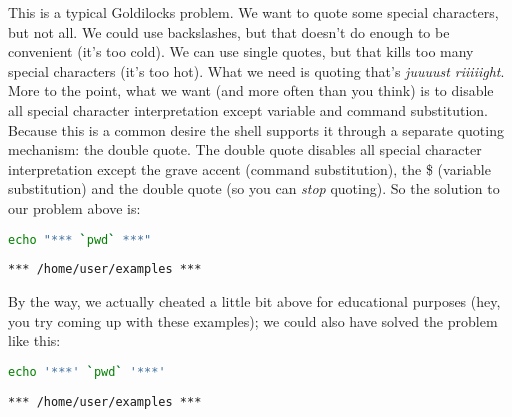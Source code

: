 This is a typical Goldilocks problem. We want to quote some special characters,
but not all. We could use backslashes, but that doesn't do enough to be
convenient (it's too cold). We can use single quotes, but that kills too many
special characters (it's too hot). What we need is quoting that's \emph{juuuust
riiiiight}. More to the point, what we want (and more often than you think) is
to disable all special character interpretation except variable and command
substitution. Because this is a common desire the shell supports it through a
separate quoting mechanism: the double quote. The double quote disables all
special character interpretation except the grave accent (command
substitution), the \$ (variable substitution) and the double quote (so you can
\emph{stop} quoting). So the solution to our problem above is:

\lstset{basicstyle=\scriptsize, numbers=left, captionpos=b, tabsize=4}
\begin{lstlisting}[caption=Printing the working directory with decorations take II,language={bash},
breaklines=true,xleftmargin=15pt,label=lst:Printing the working directory with decorations take II]
echo "*** `pwd` ***"
\end{lstlisting}

\scriptsize
\begin{verbatim}
*** /home/user/examples ***
\end{verbatim}
\normalsize

By the way, we actually cheated a little bit above for educational purposes
(hey, you try coming up with these examples); we could also have solved the
problem like this:

\lstset{basicstyle=\scriptsize, numbers=left, captionpos=b, tabsize=4}
\begin{lstlisting}[caption=Printing the working directory with decorations alternative,language={bash},
breaklines=true,xleftmargin=15pt,label=lst:Printing the working directory with decorations alternative]
echo '***' `pwd` '***'
\end{lstlisting}

\scriptsize
\begin{verbatim}
*** /home/user/examples ***
\end{verbatim}
\normalsize
